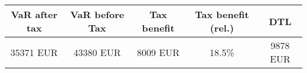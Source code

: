 \center
\label{table_port_var_tax}
\begin{tabular}{c|c|c|c|c}
VaR after tax & VaR before Tax & Tax benefit & Tax benefit (rel.) & DTL \\\hline
    35371 EUR &     43380 EUR &      8009 EUR & 18.5\% &      9878 EUR \\
\end{tabular}
